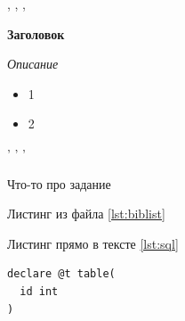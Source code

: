 


\tableofcontents


\newpage
\Chapter{\lab\ \labnumber}{\labtheme}{}


\begin{center} , , , \end{center}
\noindent
\textbf{
   Заголовок
}

\textit{
    Описание
}

\begin{itemize}
    \setlength{\itemsep}{0pt} %
    \setlength{\parskip}{0pt}
    \setlength{\parsep}{0pt} 
    \item 1
    \item 2
\end{itemize}

\begin{center} ' ' ' \end{center}

\newpage
{}
Что-то про задание

Листинг из файла \ref{lst:biblist}


Листинг прямо в тексте \ref{lst:sql}
\begin{lstlisting}[caption={SQL},label={lst:sql}]
declare @t table(
  id int
)
\end{lstlisting}

